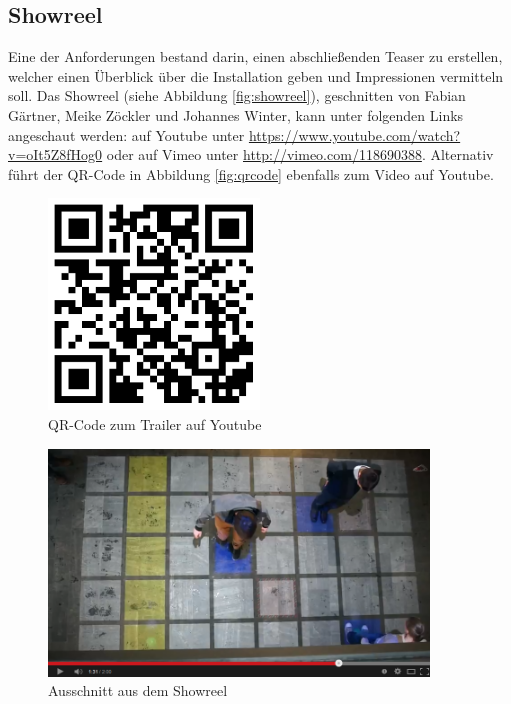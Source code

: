 \subsection{Showreel}

Eine der Anforderungen bestand darin, einen abschließenden Teaser zu erstellen, welcher einen Überblick über die Installation geben und Impressionen vermitteln soll. Das Showreel (siehe Abbildung \autoref{fig:showreel}), geschnitten von Fabian Gärtner, Meike Zöckler und Johannes Winter, kann unter folgenden Links angeschaut werden: auf Youtube unter \url{https://www.youtube.com/watch?v=oIt5Z8fHog0} oder auf Vimeo unter \url{http://vimeo.com/118690388}. Alternativ führt der QR-Code in Abbildung \autoref{fig:qrcode} ebenfalls zum Video auf Youtube.

\begin{figure}[htbp]
	\centering
		\includegraphics[width=0.5\textwidth]{images/qrcode.png}
	\caption{QR-Code zum Trailer auf Youtube}
	\label{fig:qrcode}
\end{figure}

\begin{figure}[htbp]
	\centering
		\includegraphics[width=0.9\textwidth]{images/showreel.png}
	\caption{Ausschnitt aus dem Showreel}
	\label{fig:showreel}
\end{figure}